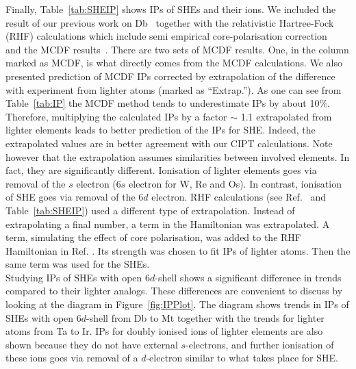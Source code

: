 \documentclass[10pt,a4paper, twoside, openright]{report}
\begin{document}
Finally, Table~\ref{tab:SHEIP} shows IPs of SHEs and their ions. We included the result of our previous work on Db~\cite{LDFDb2018} together with the relativistic Hartree-Fock (RHF) calculations which include semi empirical core-polarisation correction~\cite{Dzuba2016} and the MCDF results~\cite{MCDF-Sg,MCDF-BhHs}. There are two sets of MCDF results. One, in the column marked as MCDF, is what directly comes from the MCDF calculations. We also presented prediction of MCDF IPs corrected by extrapolation of the difference with experiment from lighter atoms (marked as ``Extrap.''). As one can see from Table~\ref{tab:IP} the MCDF method tends to underestimate IPs by about 10\%. Therefore, multiplying the calculated IPs by a factor $\sim$ 1.1 extrapolated from lighter elements leads to better prediction of the IPs for SHE. Indeed, the extrapolated values are in better agreement with our CIPT calculations. Note however that the extrapolation assumes similarities between involved elements. In fact, they are significantly different. Ionisation of lighter elements goes via removal of the $s$ electron ($6s$ electron for W, Re and Os). In contrast, ionisation of SHE goes via removal of the $6d$ electron. RHF calculations (see Ref.~\cite{Dzuba2016} and Table~\ref{tab:SHEIP}) used a different type of extrapolation. Instead of extrapolating a final number, a term in the Hamiltonian was extrapolated. A term, simulating the effect of core polarisation, was added to the RHF Hamiltonian in Ref. \cite{Dzuba2016}. Its strength was chosen to fit IPs of lighter atoms. Then the same term was used for the SHEs. \\
\linebreak
Studying IPs of SHEs with open $6d$-shell shows a significant difference in trends compared to their lighter analogs. These differences are convenient to discuss by looking at the diagram in Figure~\ref{fig:IPPlot}. The diagram shows trends in IPs of SHEs with open $6d$-shell from Db to Mt together with the trends for lighter atoms from Ta to Ir. IPs for doubly ionised ions of lighter elements are also shown because they do not have external $s$-electrons, and further ionisation of these ions goes via removal of a $d$-electron similar to what takes place for SHE. \\
\linebreak
\end{document}
